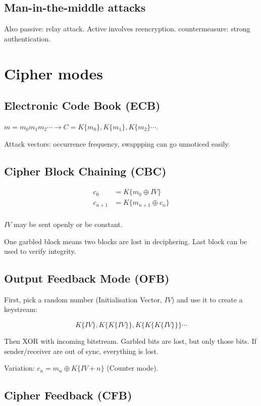 \documentclass{article}
\begin{document}
\subsection{Man-in-the-middle attacks}

Also passive: relay attack. Active involves reencryption. countermeasure:
strong authentication.

\section{Cipher modes}

\subsection{Electronic Code Book (ECB)}
$m = m_0m_1m_2\cdots \rightarrow C = K\{m_0\},K\{m_1\},K\{m_2\}\cdots$.

Attack vectors: occurrence frequency, swappping can go unnoticed easily.

\subsection{Cipher Block Chaining (CBC)}

\begin{align*}
  c_0     &= K\{m_0 \oplus IV\} \\
  c_{n+1} &= K\{m_{n+1} \oplus c_n\} \\
\end{align*}

$IV$ may be sent openly or be constant.

One garbled block means two blocks are lost in deciphering. Last block
can be used to verify integrity.

\subsection{Output Feedback Mode (OFB)}

First, pick a random number (Initialisation Vector, $IV$) and use it to
create a keystream:

\[ K\{IV\},K\{K\{IV\}\}, K\{K\{K\{IV\}\}\} \cdots \]

Then XOR with incoming bitstream. Garbled bits are lost, but only those bits.
If sender/receiver are out of sync, everything is lost.

Variation: $c_n = m_n \oplus K\{IV + n\}$ (Counter mode).

\subsection{Cipher Feedback (CFB)}
\end{document}
